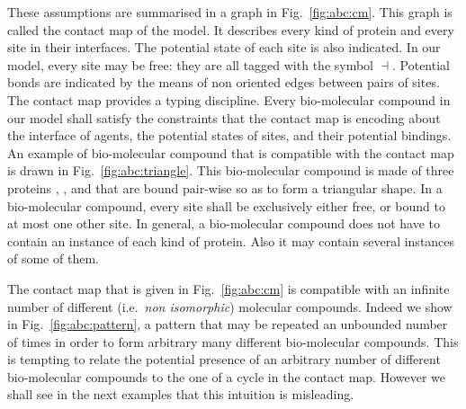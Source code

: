 \documentclass{entcs}
\newcommand{\freesymbol}{\dashv}
\begin{document}
These assumptions are summarised in a graph in Fig.~\ref{fig:abc:cm}. This graph is called the contact map of the model. It describes every kind of protein and every site in their interfaces. The potential state of each site is also indicated. In our model, every site may be free: they are all tagged with the symbol $\freesymbol$. Potential bonds are indicated by the means of non oriented edges between pairs of sites.  The contact map provides a typing discipline.
Every bio-molecular compound in our model shall satisfy the constraints that the contact map is encoding about the interface of agents, the potential states of sites, and their potential bindings. An example of bio-molecular compound that is compatible with the contact map is drawn in Fig.~\ref{fig:abc:triangle}. This bio-molecular compound is made of three proteins , , and  that are bound pair-wise so as to form a triangular shape.
In a bio-molecular compound, every site shall be exclusively either free, or bound to at most one other site. In general, a bio-molecular compound does not have to contain an instance of each kind of protein. Also it may contain several instances of some of them.

The contact map that is given in Fig.~\ref{fig:abc:cm} is compatible with an infinite number of different (i.e.~\emph{non isomorphic}) molecular compounds.
Indeed we show in Fig.~\ref{fig:abc:pattern}, a pattern
that may be repeated an unbounded number of times in order to form arbitrary many different bio-molecular compounds. This is tempting to relate the potential presence of an arbitrary number of different bio-molecular compounds to the one of a cycle in the contact map. However we shall see in the next examples that this intuition is misleading.
\end{document}
